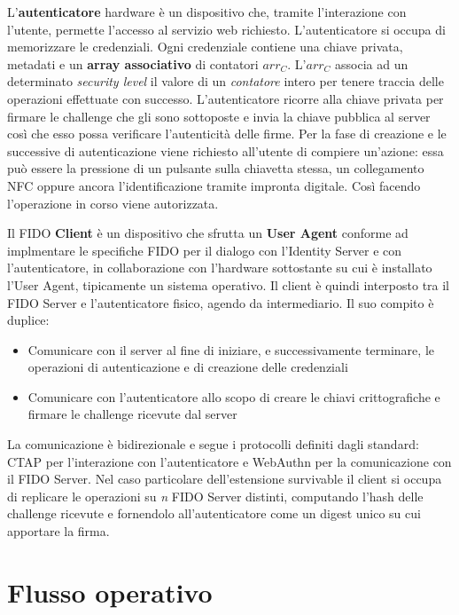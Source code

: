 L'\textbf{autenticatore} hardware è un dispositivo che, tramite l'interazione con l'utente, permette l'accesso al servizio web richiesto. L'autenticatore si occupa di memorizzare le credenziali. Ogni credenziale contiene una chiave privata, metadati e un \textbf{array associativo} di contatori ${arr_C}$. L'${arr_C}$ associa ad un determinato \emph{security level} il valore di un \emph{contatore} intero per tenere traccia delle operazioni effettuate con successo. L'autenticatore ricorre alla chiave privata per firmare le challenge che gli sono sottoposte e invia la chiave pubblica al server così che esso possa verificare l'autenticità delle firme. 
Per la fase di creazione e le successive di autenticazione viene richiesto all'utente di compiere un'azione: essa può essere la pressione di un pulsante sulla chiavetta stessa, un collegamento NFC oppure ancora l'identificazione tramite impronta digitale. Così facendo l'operazione in corso viene autorizzata.

Il FIDO \textbf{Client} è un dispositivo che sfrutta un \textbf{User Agent} conforme ad implmentare le specifiche FIDO per il dialogo con l'Identity Server e con l'autenticatore, in collaborazione con l'hardware sottostante su cui è installato l'User Agent, tipicamente un sistema operativo. Il client è quindi interposto tra il FIDO Server e l'autenticatore fisico, agendo da intermediario. Il suo compito è duplice:
\begin{itemize}
	\item Comunicare con il server al fine di iniziare, e successivamente terminare, le operazioni di autenticazione e di creazione delle credenziali 
	\item Comunicare con l'autenticatore allo scopo di creare le chiavi crittografiche e firmare le challenge ricevute dal server
\end{itemize}
La comunicazione è bidirezionale e segue i protocolli definiti dagli standard: CTAP per l'interazione con l'autenticatore e WebAuthn per la comunicazione con il FIDO Server. 
Nel caso particolare dell'estensione survivable il client si occupa di replicare le operazioni su \emph{n} FIDO Server distinti, computando l'hash delle challenge ricevute e fornendolo all'autenticatore come un digest unico su cui apportare la firma. 


\section{Flusso operativo}
\label{flusso_operativo}

